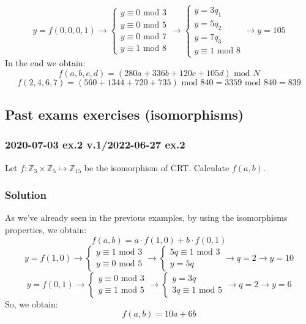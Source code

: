 \documentclass[11pt, a4paper]{article}
\newcommand{\mymod}{
    \text{ mod }
}
\begin{document}
\begin{equation*}
  y=f(0,0,0,1)\longrightarrow
  \begin{cases}
      y\equiv0\mymod3\\
      y\equiv0\mymod5\\
      y\equiv0\mymod7\\
      y\equiv1\mymod8
  \end{cases}\longrightarrow
  \begin{cases}
      y=3q_1\\
      y=5q_2\\
      y=7q_3\\
      y\equiv1\mymod8
  \end{cases}\longrightarrow
  y=105
\end{equation*}
In the end we obtain:
$$f(a,b,c,d)=(280a+336b+120c+105d)\mymod N$$
$$f(2,4,6,7)=(560+1344+720+735)\mymod840=3359\mymod840=839$$

\newpage
\subsection{Past exams exercises (isomorphisms)}
\subsubsection{2020-07-03 ex.2 v.1/2022-06-27 ex.2}
Let $f:\mathbb{Z}_3\times\mathbb{Z}_5\mapsto\mathbb{Z}_{15}$ be the isomorphism of CRT. Calculate $f(a,b)$.
\subsubsection*{Solution}
As we've already seen in the previous examples, by using the isomorphisms properties, we obtain:
$$f(a,b)=a\cdot f(1,0) + b\cdot f(0,1)$$
\begin{equation*}
    y=f(1,0)\longrightarrow
    \begin{cases}
        y\equiv1\mymod3\\
        y\equiv0\mymod5
    \end{cases}
    \longrightarrow
    \begin{cases}
        5q\equiv1\mymod3\\
        y=5q
    \end{cases}
    \longrightarrow q=2\longrightarrow y=10
\end{equation*}
\begin{equation*}
    y=f(0,1)\longrightarrow
    \begin{cases}
        y\equiv0\mymod3\\
        y\equiv1\mymod5
    \end{cases}
    \longrightarrow
    \begin{cases}
        y=3q\\
        3q\equiv1\mymod5
    \end{cases}
    \longrightarrow q=2\longrightarrow y=6
\end{equation*}
So, we obtain:
$$f(a,b)=10a+6b$$
\end{document}
